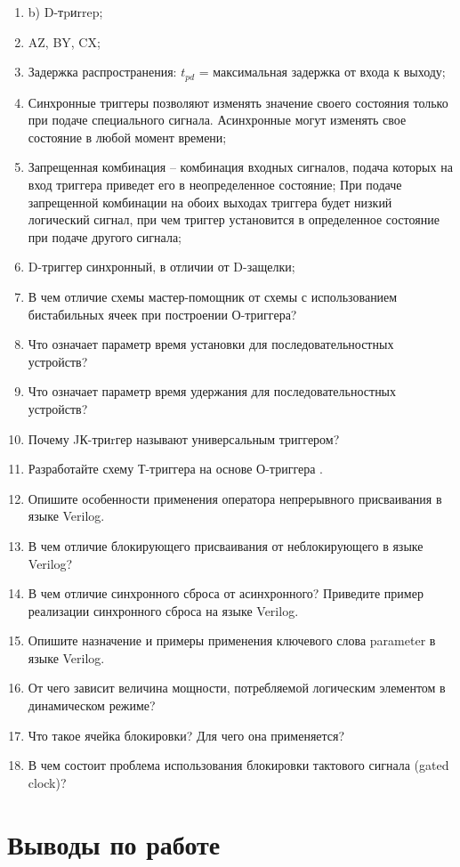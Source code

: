 \documentclass[a4paper,14pt]{article}
\begin{document}
\begin{enumerate}
	\item b) D-тpиrrep;
	\item AZ, BY, CX;
	\item Задержка распространения: $t_{pd}$ = максимальная задержка от входа к выходу;
	\item Синхронные триггеры позволяют изменять значение своего состояния только при подаче специального сигнала.
	Асинхронные могут изменять свое состояние в любой момент времени;
	\item Запрещенная комбинация -- комбинация входных сигналов, подача которых на вход триггера приведет его в неопределенное состояние;
	При подаче запрещенной комбинации на обоих выходах триггера будет низкий логический сигнал, при чем триггер установится в определенное состояние при подаче другого сигнала;
	\item D-триггер синхронный, в отличии от D-защелки;
	\item В чем отличие схемы мастер-помощник от схемы с использованием бистабильных ячеек при построении О-триггера?
	\item Что означает параметр время установки для последовательностных устройств?
	\item Что означает параметр время удержания для последовательностных устройств?
	\item Почему JК-триrгер называют универсальным триггером?
	\item Разработайте схему Т-триггера на основе О-триггера .
	\item Опишите особенности применения оператора непрерывного присваивания в языке Verilog.
	\item В чем отличие блокирующего присваивания от неблокирующего в языке Verilog?
	\item В чем отличие синхронного сброса от асинхронного? Приведите пример реализации	синхронного сброса на языке Verilog.
	\item Опишите назначение и примеры применения ключевого слова parameter в языке	Verilog.
	\item От чего зависит величина мощности, потребляемой логическим элементом в динамическом режиме?
	\item Что такое ячейка блокировки? Для чего она применяется?
	\item В чем состоит проблема использования блокировки тактового сигнала (gated clock)?
\end{enumerate}

\section{Выводы по работе}
\end{document}
